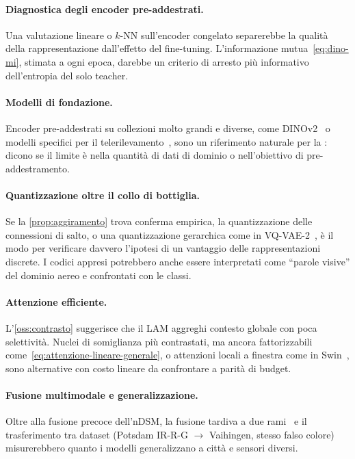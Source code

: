 \paragraph{Diagnostica degli encoder pre-addestrati.}
Una valutazione lineare o $k$-NN sull'encoder congelato separerebbe la qualità della
rappresentazione dall'effetto del fine-tuning. L'informazione mutua~\eqref{eq:dino-mi}, stimata a
ogni epoca, darebbe un criterio di arresto più informativo dell'entropia del solo teacher.

\paragraph{Modelli di fondazione.}
Encoder pre-addestrati su collezioni molto grandi e diverse, come DINOv2~\cite{oquab2024dinov2} o
modelli specifici per il telerilevamento~\cite{wang2022ssl_rs}, sono un riferimento naturale per
la : dicono se il limite è nella quantità di dati di dominio o nell'obiettivo di
pre-addestramento.

\paragraph{Quantizzazione oltre il collo di bottiglia.}
Se la \cref{prop:aggiramento} trova conferma empirica, la quantizzazione delle connessioni di
salto, o una quantizzazione gerarchica come in VQ-VAE-2~\cite{razavi2019vqvae2}, è il modo per
verificare davvero l'ipotesi di un vantaggio delle rappresentazioni discrete. I codici appresi
potrebbero anche essere interpretati come \enquote{parole visive} del dominio aereo e confrontati
con le classi.

\paragraph{Attenzione efficiente.}
L'\cref{oss:contrasto} suggerisce che il LAM aggreghi contesto globale con poca selettività.
Nuclei di somiglianza più contrastati, ma ancora fattorizzabili
come~\eqref{eq:attenzione-lineare-generale}, o attenzioni locali a finestra come in
Swin~\cite{liu2021swin}, sono alternative con costo lineare da confrontare a parità di budget.

\paragraph{Fusione multimodale e generalizzazione.}
Oltre alla fusione precoce dell'nDSM, la fusione tardiva a due rami~\cite{audebert2018beyond} e il
trasferimento tra dataset (Potsdam IR-R-G $\to$ Vaihingen, stesso falso colore) misurerebbero
quanto i modelli generalizzano a città e sensori diversi.

